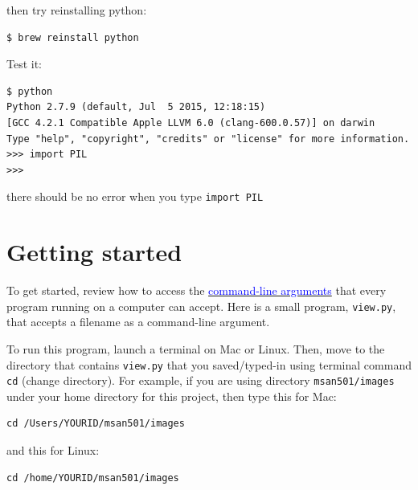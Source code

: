 \noindent then try reinstalling python:

\begin{lstlisting}[style=BashInputStyle]
$ brew reinstall python
\end{lstlisting}
\noindent Test it:

\begin{lstlisting}[style=BashInputStyle]
$ python
Python 2.7.9 (default, Jul  5 2015, 12:18:15) 
[GCC 4.2.1 Compatible Apple LLVM 6.0 (clang-600.0.57)] on darwin
Type "help", "copyright", "credits" or "license" for more information.
>>> import PIL
>>>
\end{lstlisting}

\noindent there should be no error when you type {\tt import PIL}

\section{Getting started}

To get started, review how to access the \href{http://stackoverflow.com/questions/4117530/sys-argv1-meaning-in-script}{\textcolor{blue}{command-line arguments}} that every program running on a computer can accept. Here is a small program, {\tt view.py}, that accepts a filename as a command-line argument.


To run this program, launch a terminal on Mac or Linux. Then, move to the directory that contains {\tt view.py} that you saved/typed-in using terminal command {\tt cd} (change directory).  For example, if you are using directory {\tt msan501/images} under your home directory for this project, then type this for Mac:

\begin{lstlisting}[style=BashInputStyle]
cd /Users/YOURID/msan501/images
\end{lstlisting}

\noindent and this for Linux:

\begin{lstlisting}[style=BashInputStyle]
cd /home/YOURID/msan501/images
\end{lstlisting}

